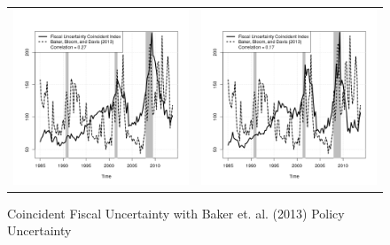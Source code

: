 \documentclass[11pt]{article}
\begin{document}
\begin{figure}\caption{Coincident Fiscal Uncertainty with Baker et. al. (2013) Policy Uncertainty}\label{fg:fpuindex}
\hspace*{-0.3in}\begin{tabular}{cc}
\includegraphics[scale=0.5]{./results/pics0.01/fpuindex.png} & \includegraphics[scale=0.5]{./results/pics0.02/fpuindex.png} \\ 

\end{tabular}
\end{figure}
\end{document}
